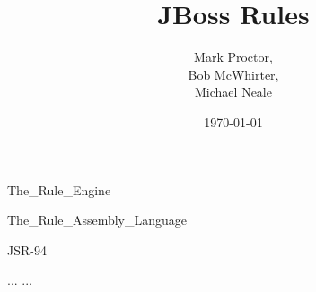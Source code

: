 \documentclass[14pt]{extbook}
\begin{document}
\title{\Huge\bf JBoss Rules}
\author{Mark Proctor,\\ 
       Bob McWhirter,\\ 
       Michael Neale}
\date{\today}
\maketitle

\tableofcontents

 {The_Rule_Engine}

 {The_Rule_Assembly_Language}

 {JSR-94}

\begin{thebibliography}{99}
 ...
 ...
\end{thebibliography}

\printindex
\end{document}
